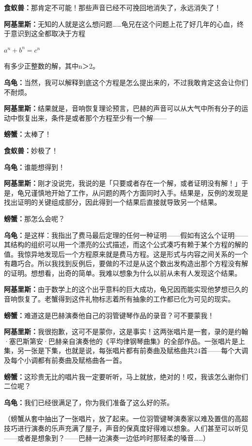 \documentclass[
  12pt,
  twoside,
  openright,
  oldfontcommands,
]{memoir}
\newcommand{\dialogname}[1]{{\heifamily\bfseries #1}}
\begin{document}
\dialogname{食蚁兽：}那肯定不可能！那些声音已经不可挽回地消失了，永远消失了！

\dialogname{阿基里斯：}无知的人就是这么想问题\ldots\ldots 龟兄在这个问题上花了好几年的心血，终于意识到这全都取决于方程

$a^n+b^n=c^n$

有多少正整数的解，其中n＞2。

\dialogname{乌龟：}当然，我可以解释到底这个方程是怎么提出来的，不过我敢肯定这会让你们不耐烦。

\dialogname{阿基里斯：}结果就是，音响恢复理论预言，巴赫的声音可以从大气中所有分子的运动中恢复出来，条件是或者那个方程至少有一个解------

\dialogname{螃蟹：}太棒了！

\dialogname{食蚁兽：}妙极了！

\dialogname{乌龟：}谁能想得到！

\dialogname{阿基里斯：}刚才没说完，我说的是「只要或者存在一个解，或者证明没有解！」于是，龟兄谨慎地开始了工作，从问题的两个方面同时入手。结果是，反例的发现是找出证明的关键组成部分，因此得到一个结果后直接就导致另一个结果。

\dialogname{螃蟹：}那怎么会呢？

\dialogname{乌龟：}是这样：我指出了费马最后定理的任何一种证明------假如有这么个证明------其结构的组织可以用一个漂亮的公式描述，而这个公式凑巧有赖于某个方程的解的值。我惊异地发现后一个方程原来就是费马方程。这是形式与内容之间关系的一个有趣巧合。所以我找到反例后，要做的不过是从这个数出发构造出那个方程没有解的证明。想想看，出奇的简单。我难以想象为什么以前从未有人发现这个结果。

\dialogname{阿基里斯：}由于数学上的这个出乎意料的巨大成功，龟兄因而能实现他梦想已久的音响恢复了。老蟹得到这件礼物标志着所有抽象的工作都已化为可见的现实。

\dialogname{螃蟹：}难道这是巴赫演奏他自己的羽管键琴作品的录音？可不要蒙我！

\dialogname{阿基里斯：}我很抱歉，这可不是蒙你，这是事实！这两张唱片是一套，录的是约翰·塞巴斯第安·巴赫亲自演奏他的《平均律钢琴曲集》的全部作品。一张唱片是上集，另一张是下集，也就是说，每张唱片都有前奏曲及赋格曲共24首------每个大调及每个小调都有前奏曲及赋格曲各一首。

\dialogname{螃蟹：}这珍贵无比的唱片我一定要听听，马上就放，绝对的！哎，我该怎么谢你们二位呢？

\dialogname{乌龟：}我们已经很满足了，你为我们准备了这么好的茶。

（螃蟹从套中抽出了一张唱片，放了起来。一位羽管键琴演奏家以难及置信的高超技巧进行演奏的乐声充满了屋子，声音的保真度好得难以想象。人们甚至可以听见------或者是想象到？------巴赫一边演奏一边低吟时那轻柔的嗓音\ldots\ldots）
\end{document}
